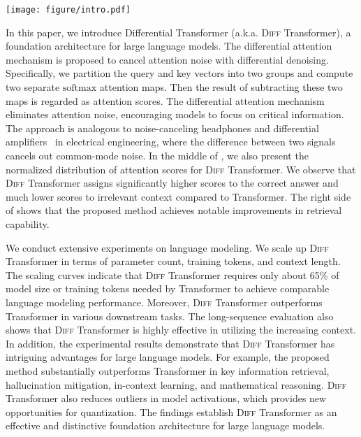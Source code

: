 \documentclass{article}
\newcommand{\softmax}{\mathrm{softmax}}
\newcommand\our{Differential Transformer}
\newcommand\ourattn{differential attention}
\newcommand\diff{\textsc{Diff} Transformer}
\newcommand\trm{Transformer}
\begin{document}
\begin{figure*}[h]
\centering
\captionsetup{type=figure}
\texttt{[image: figure/intro.pdf]}
\caption{Transformer often over-attends to irrelevant context (i.e., attention noise). \textsc{Diff} Transformer amplifies attention to answer spans and cancels noise, enhancing the capability of context modeling.
}
\label{fig:intro}
\end{figure*}

In this paper, we introduce \our{} (a.k.a. \diff{}), a foundation architecture for large language models.
The \ourattn{} mechanism is proposed to cancel attention noise with differential denoising.
Specifically, we partition the query and key vectors into two groups and compute two separate $\softmax$ attention maps. Then the result of subtracting these two maps is regarded as attention scores.
The \ourattn{} mechanism eliminates attention noise, encouraging models to focus on critical information.
The approach is analogous to noise-canceling headphones and differential amplifiers~\citep{differential} in electrical engineering, where the difference between two signals cancels out common-mode noise.
In the middle of , we also present the normalized distribution of attention scores for \diff{}.
We observe that \diff{} assigns significantly higher scores to the correct answer and much lower scores to irrelevant context compared to Transformer.
The right side of  shows that the proposed method achieves notable improvements in retrieval capability.

We conduct extensive experiments on language modeling.
We scale up \diff{} in terms of parameter count, training tokens, and context length.
The scaling curves indicate that \diff{} requires only about 65\% of model size or training tokens needed by Transformer to achieve comparable language modeling performance.
Moreover, \diff{} outperforms \trm{} in various downstream tasks.
The long-sequence evaluation also shows that \diff{} is highly effective in utilizing the increasing context.
In addition, the experimental results demonstrate that \diff{} has intriguing advantages for large language models.
For example, the proposed method substantially outperforms Transformer in key information retrieval, hallucination mitigation, in-context learning, and mathematical reasoning.
\diff{} also reduces outliers in model activations, which provides new opportunities for quantization.
The findings establish \diff{} as an effective and distinctive foundation architecture for large language models.
\end{document}
